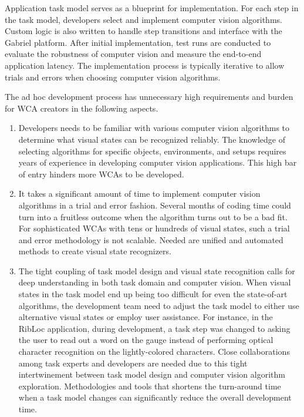 Application task model serves as a blueprint for implementation. For each step
in the task model, developers select and implement computer vision algorithms.
Custom logic is also written to handle step transitions and interface with the
Gabriel platform. After initial implementation, test runs are conducted to
evaluate the robustness of computer vision and measure the end-to-end
application latency. The implementation process is typically iterative to allow
trials and errors when choosing computer vision algorithms.

The ad hoc development process has unnecessary high requirements and burden for
WCA creators in the following aspects.
\begin{enumerate}
  \item Developers needs to be familiar with various computer vision algorithms
to determine what visual states can be recognized reliably. The knowledge of
selecting algorithms for specific objects, environments, and setups requires
years of experience in developing computer vision applications. This high bar of
entry hinders more WCAs to be developed.
  \item It takes a significant amount of time to implement computer vision
algorithms in a trial and error fashion. Several months of coding time could
turn into a fruitless outcome when the algorithm turns out to be a bad fit. For
sophisticated WCAs with tens or hundreds of visual states, such a trial and
error methodology is not scalable. Needed are unified and automated methods to
create visual state recognizers.
  \item The tight coupling of task model design and visual state recognition
calls for deep understanding in both task domain and computer vision. When
visual states in the task model end up being too difficult for even the
state-of-art algorithms, the development team need to adjust the task model to
either use alternative visual states or employ user assistance. For instance, in
the RibLoc application, during development, a task step was changed to asking
the user to read out a word on the gauge instead of performing optical character
recognition on the lightly-colored characters. Close collaborations among task
experts and developers are needed due to this tight intertwinement between task
model design and computer vision algorithm exploration. Methodologies and tools
that shortens the turn-around time when a task model changes can significantly
reduce the overall development time.
\end{enumerate}



